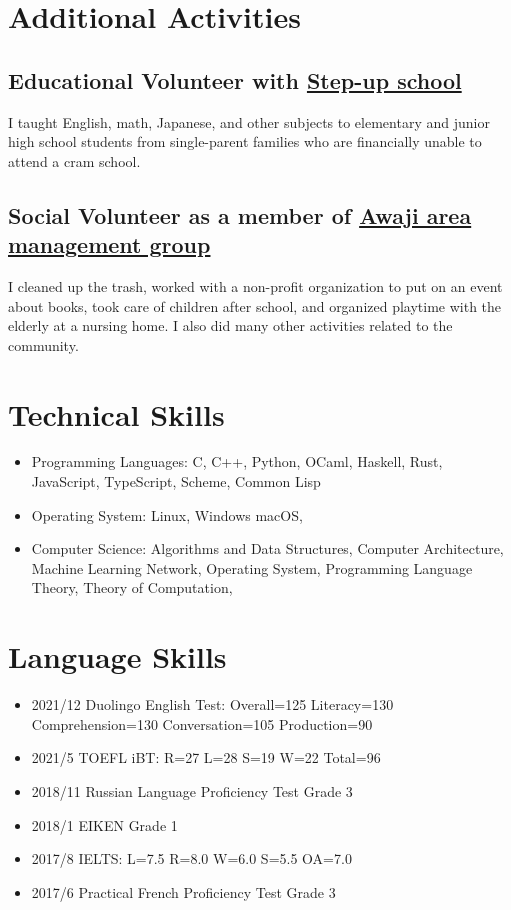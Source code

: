 \documentclass[12pt]{article}
\begin{document}
\section*{Additional Activities}
  \subsection*{Educational Volunteer with \href{https://stepup-unesco.com/}{Step-up school}}
    I taught English, math, Japanese, and other subjects to elementary and junior high school students from single-parent families who are financially unable to attend a cram school.
  \subsection*{Social Volunteer as a member of \href{https://www.waterras.com/awaji_am.html}{Awaji area management group}}
    I cleaned up the trash, worked with a non-profit organization to put on an event about books, took care of children after school, and organized playtime with the elderly at a nursing home.
    I also did many other activities related to the community.

\section*{Technical Skills}
    \begin{itemize}
      \item Programming Languages:
        C,
        C++,
        Python,
        OCaml,
        Haskell,
        Rust,
        JavaScript,
        TypeScript,
        Scheme,
        Common Lisp
      \item Operating System:
        Linux,
        Windows
        macOS,
      \item Computer Science:
        Algorithms and Data Structures,
        Computer Architecture,
        Machine Learning
        Network,
        Operating System,
        Programming Language Theory,
        Theory of Computation,
    \end{itemize}

\section*{Language Skills}
  \begin{itemize}
    \item 2021/12 Duolingo English Test: Overall=125 Literacy=130 Comprehension=130 Conversation=105 Production=90
    \item 2021/5 TOEFL iBT: R=27 L=28 S=19 W=22 Total=96
    \item 2018/11 Russian Language Proficiency Test Grade 3
    \item 2018/1 EIKEN Grade 1
    \item 2017/8 IELTS: L=7.5 R=8.0 W=6.0 S=5.5 OA=7.0
    \item 2017/6 Practical French Proficiency Test Grade 3
  \end{itemize}
\end{document}

